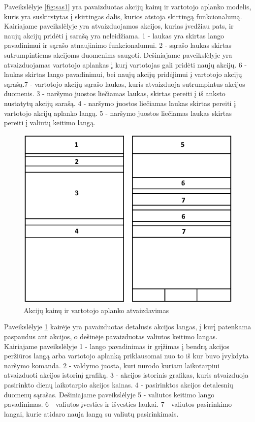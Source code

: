 \documentclass[a4paper,12pt,fleqn]{article}
\begin{document}
Paveikslėlyje \ref{fig:sas1} yra pavaizduotas akcijų kainų ir vartotojo aplanko modelis, kuris yra suskirstytas į skirtingas dalis, kurios atstoja skirtingą funkcionalumą. Kairiajame paveikslėlyje yra atvaizduojamos akcijos, kurias įvedžiau pats, ir naujų akcijų pridėti į sarašą yra neleidžiama. 1 - laukas yra skirtas lango pavadinimui ir sąrašo atnaujinimo funkcionalumui. 2 - sąrašo laukas skirtas sutrumpintiems akcijoms duomenims saugoti. Dešiniajame paveikslėlyje yra atvaizduojamas vartotojo aplankas į kurį vartotojas gali pridėti naujų akcijų. 6 - laukas skirtas lango pavadinimui, bei naujų akcijų pridėjimui į vartotojo akcijų sąrašą.7 - vartotojo akcijų sąrašo laukas, kuris atvaizduoja sutrumpintus akcijos duomenis. 3 - naršymo juostos liečiamas laukas, skirtas pereiti į iš anksto nustatytų akcijų sarašą. 4 - naršymo juostos liečiamas laukas skirtas pereiti į vartotojo akcijų aplanko langą. 5 - naršymo juostos liečiamas laukas skirtas pereiti į valiutų keitimo langą.

\newpage
\begin{figure}[h]
	\centering
	\includegraphics[width=0.55\linewidth]{vartotojo-sasaja2.png}
	\caption{Akcijų kainų ir vartotojo aplanko atvaizdavimas}
	\label{fig:sas2}
\end{figure}
Paveikslėlyje \ref{fig:sas2} kairėje yra pavaizduotas detalusis akcijos langas, į kurį patenkama paspaudus ant akcijos, o dešinėje pavaizduotas valiutos keitimo langas. Kairiajame paveikslėlyje 1 - lango pavadinimas ir grįžimas į bendrą akcijos peržiūros langą arba vartotojo aplanką priklausomai nuo to iš kur buvo įvykdyta naršymo komanda. 2 - valdymo juosta, kuri nurodo kuriam laikotarpiui atvaizduoti akcijos istorinį grafiką. 3 - akcijos istorinis grafikas, kuris atvaizduoja pasirinkto dienų laikotarpio akcijos kainas. 4 - pasirinktos akcijos detalesnių duomenų sąrašas. Dešiniajame paveikslėlyje 5 - valiutos keitimo lango pavadinimas. 6 - valiutos įvesties ir išvesties laukai. 7 - valiutos pasirinkimo langai, kurie atidaro nauja langą su valiutų pasirinkimais.
\end{document}
